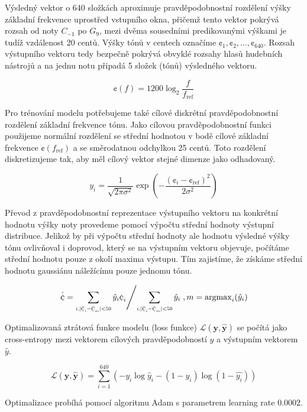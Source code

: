 Výsledný vektor o 640 složkách aproximuje pravděpodobnostní rozdělení výšky základní frekvence uprostřed vstupního okna, přičemž tento vektor pokrývá rozsah od noty $C_{-1}$ po $G_{9}$, mezi dvěma sousedními predikovanými výškami je tudíž vzdálenost 20 centů. Výšky tónů v centech označíme $\cent_1, \cent_2, \dots, \cent_{640}$. Rozsah výstupního vektoru tedy bezpečně pokrývá obvyklé rozsahy hlasů hudebních nástrojů a na jednu notu připadá 5 složek (tónů) výsledného vektoru.

    $$\cent(f) = 1200 \log_2{\frac{f}{f_{\mathrm{ref}}}}$$

Pro trénování modelu potřebujeme také cílové diskrétní pravděpodobnostní rozdělení základní frekvence tónu. Jako cílovou pravděpodobnostní funkci použijeme normální rozdělení se střední hodnotou v bodě cílové základní frekvence $\cent(f_{\mathrm{ref}})$ a se směrodatnou odchylkou 25 centů. Toto rozdělení diskretizujeme tak, aby měl cílový vektor stejné dimenze jako odhadovaný.

    $$y_i = \frac{1}{\sqrt{2 \pi \sigma^2}}\exp{(-\frac{(\cent_i - \cent_{\mathrm{ref}})^2}{2 \sigma^2})}$$

Převod z pravděpodobnostní reprezentace výstupního vektoru na konkrétní hodnotu výšky noty provedeme pomocí výpočtu střední hodnoty výstupní distribuce. Jelikož by při výpočtu střední hodnoty ale hodnotu výsledné výšky tónu ovlivňoval i doprovod, který se na výstupním vektoru objevuje, počítáme střední hodnotu pouze z okolí maxima výstupu. Tím zajistíme, že získáme střední hodnotu gaussiánu náležícímu pouze jednomu tónu.

    $$ \left. \hat{\cent} = \sum_{\scaleto{i, \lvert \cent_i - \cent_m \rvert < 50}{8pt}} {\hat{y}_i \cent_i} \middle/ \sum_{\scaleto{i, \lvert \cent_i - \cent_m \rvert < 50}{8pt}} \hat{y}_i \right., m = \mathrm{argmax}_i(\hat{y}_i)$$

Optimalizovaná ztrátová funkce modelu (loss funkce) $\mathcal{L}(\mathbf{y}, \mathbf{\hat{y}})$ se počítá jako cross-entropy mezi vektorem cílových pravděpodobností $y$ a výstupním vektorem $\hat{y}$.

    $$\mathcal{L}(\mathbf{y}, \mathbf{\hat{y}}) = \sum_{i = 1}^{640}{(-y_i\log\hat{y}_i - (1-y_i)\log(1-\hat{y_i}))}$$

Optimalizace probíhá pomocí algoritmu Adam \citep{Kingma2014} s parametrem learning rate $0.0002$.


